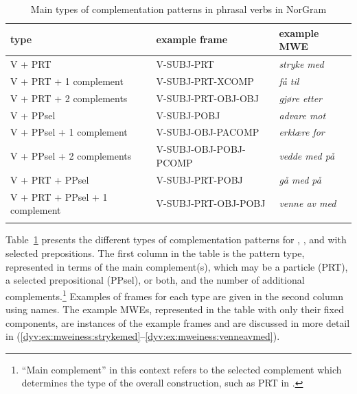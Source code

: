 \documentclass[output=paper]{langsci/langscibook}
\begin{document}
\begin{table}
  \begin{tabular}{l@{~}l@{~}l}
    \lsptoprule
    type & example frame & example MWE \\
    \midrule
    V + PRT & V-SUBJ-PRT & \emph{stryke med} \\
    V + PRT + 1 complement & V-SUBJ-PRT-XCOMP & \emph{få til} \\
    V + PRT + 2 complements & V-SUBJ-PRT-OBJ-OBJ & \emph{gjøre etter}\\     \tablevspace
    V + PPsel & V-SUBJ-POBJ & \emph{advare mot} \\
    V + PPsel + 1 complement  & V-SUBJ-OBJ-PACOMP & \emph{erklære for} \\
    V + PPsel + 2 complements & V-SUBJ-OBJ-POBJ-PCOMP & \emph{vedde med på} \\ \tablevspace
    V + PRT + PPsel & V-SUBJ-PRT-POBJ & \emph{gå med på} \\
    V + PRT + PPsel + 1 complement & V-SUBJ-PRT-OBJ-POBJ & \emph{venne av med} \\ %
    \lspbottomrule
  \end{tabular}
  \caption{Main types of complementation patterns in phrasal verbs in NorGram}
  \label{dyv:tab:mweiness:phrasaltypes}
\end{table}

Table~\ref{dyv:tab:mweiness:phrasaltypes} presents the different types of complementation patterns for , , and  with selected prepositions.
The first column in the table is the pattern type, represented in terms of the main complement(s), which may be a particle (PRT), a selected prepositional  (PPsel), or both, and the number of additional complements.\footnote{``Main complement'' in this context refers to the selected complement which determines the type of the overall construction, such as PRT in .} 
Examples of  frames for each type are given in the second column using  names.
The example MWEs, represented in the table with only their fixed components, are instances of the example frames and are discussed in more detail in (\ref{dyv:ex:mweiness:strykemed}--\ref{dyv:ex:mweiness:venneavmed}).
\end{document}
